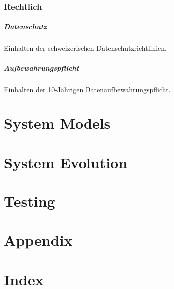\documentclass[a4paper]{scrreprt}
\begin{document}
\subsection{Rechtlich}
\paragraph{Datenschutz} Einhalten der schweizerischen Datenschutzrichtlinien. 

\paragraph{Aufbewahrungspflicht} Einhalten der 10-Jährigen Datenaufbewahrungspflicht.




\chapter{System Models}



\chapter{System Evolution}



\chapter{Testing}



\chapter{Appendix}





\chapter{Index}
\end{document}
